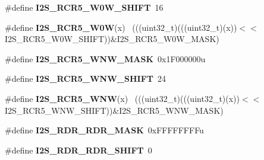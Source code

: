 \begin{DoxyCompactItemize}
\item 
\hypertarget{group___i2_s___register___masks_ga1b13ac40203b26b4adeb037896cbb88e}{}\#define {\bfseries I2\+S\+\_\+\+R\+C\+R5\+\_\+\+W0\+W\+\_\+\+S\+H\+I\+F\+T}~16\label{group___i2_s___register___masks_ga1b13ac40203b26b4adeb037896cbb88e}

\item 
\hypertarget{group___i2_s___register___masks_ga1b8eaf4b22bdc3c7a066c003ca9809c7}{}\#define {\bfseries I2\+S\+\_\+\+R\+C\+R5\+\_\+\+W0\+W}(x)                                                ~(((uint32\+\_\+t)(((uint32\+\_\+t)(x))$<$$<$I2\+S\+\_\+\+R\+C\+R5\+\_\+\+W0\+W\+\_\+\+S\+H\+I\+F\+T))\&I2\+S\+\_\+\+R\+C\+R5\+\_\+\+W0\+W\+\_\+\+M\+A\+S\+K)\label{group___i2_s___register___masks_ga1b8eaf4b22bdc3c7a066c003ca9809c7}

\item 
\hypertarget{group___i2_s___register___masks_gab6d2caff41f65c7c2c24510803d8000f}{}\#define {\bfseries I2\+S\+\_\+\+R\+C\+R5\+\_\+\+W\+N\+W\+\_\+\+M\+A\+S\+K}~0x1\+F000000u\label{group___i2_s___register___masks_gab6d2caff41f65c7c2c24510803d8000f}

\item 
\hypertarget{group___i2_s___register___masks_gade327b408882d6b24c668c4d7d4c52c8}{}\#define {\bfseries I2\+S\+\_\+\+R\+C\+R5\+\_\+\+W\+N\+W\+\_\+\+S\+H\+I\+F\+T}~24\label{group___i2_s___register___masks_gade327b408882d6b24c668c4d7d4c52c8}

\item 
\hypertarget{group___i2_s___register___masks_gacafecdb3971cb03aa4f85b106fd24210}{}\#define {\bfseries I2\+S\+\_\+\+R\+C\+R5\+\_\+\+W\+N\+W}(x)                                                ~(((uint32\+\_\+t)(((uint32\+\_\+t)(x))$<$$<$I2\+S\+\_\+\+R\+C\+R5\+\_\+\+W\+N\+W\+\_\+\+S\+H\+I\+F\+T))\&I2\+S\+\_\+\+R\+C\+R5\+\_\+\+W\+N\+W\+\_\+\+M\+A\+S\+K)\label{group___i2_s___register___masks_gacafecdb3971cb03aa4f85b106fd24210}

\item 
\hypertarget{group___i2_s___register___masks_gaccf614975eae2e2df22dafe25a0f15e5}{}\#define {\bfseries I2\+S\+\_\+\+R\+D\+R\+\_\+\+R\+D\+R\+\_\+\+M\+A\+S\+K}~0x\+F\+F\+F\+F\+F\+F\+F\+Fu\label{group___i2_s___register___masks_gaccf614975eae2e2df22dafe25a0f15e5}

\item 
\hypertarget{group___i2_s___register___masks_ga044f3938825909104af369aa0c62f2f5}{}\#define {\bfseries I2\+S\+\_\+\+R\+D\+R\+\_\+\+R\+D\+R\+\_\+\+S\+H\+I\+F\+T}~0\label{group___i2_s___register___masks_ga044f3938825909104af369aa0c62f2f5}


\end{DoxyCompactItemize}
